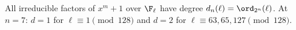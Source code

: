 All irreducible factors of $x^m+1$ over $\F_\ell$ have degree $d_n(\ell)=\ord_{2^n}(\ell)$. At $n=7$: $d=1$ for $\ell\equiv1\pmod{128}$ and $d=2$ for $\ell\equiv63,65,127\pmod{128}$.
